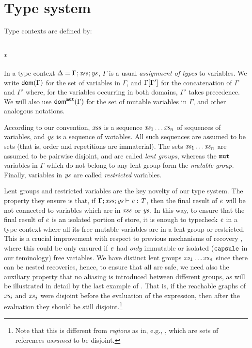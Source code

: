 \section{Type system}\label{sect:typesystem}
Type contexts are defined by:
\begin{center}
\begin{grammatica}
\\*
\end{grammatica}
\end{center} 
{In a type context $\Delta=\Gamma;\mathit{xss};\mathit{ys}$, $\Gamma$ is a usual {\em assignment of types} to variables. We write $\textsf{dom}(\Gamma)$ for the set of variables in $\Gamma$, and  $\Gamma[\Gamma']$ for the concatenation of $\Gamma$ and $\Gamma'$ where, for the variables occurring in both domains, $\Gamma'$ takes precedence.  We will also use $\textsf{dom}^{\texttt{mut}}(\Gamma)$ for the set of mutable variables in $\Gamma$, and other analogous notations.}

{According to our convention, $\mathit{xss}$ is a sequence $\mathit{xs}_1\ldots\mathit{xs}_n$ of sequences of variables, and $\mathit{ys}$ is a sequence of variables. All such sequences are assumed to be sets (that is, order and repetitions are immaterial). The sets  $\mathit{xs}_1\ldots\mathit{xs}_n$ are assumed to be pairwise disjoint, and are called \emph{{lent group}s}, whereas the $\texttt{mut}$ variables in $\Gamma$ which do not belong to any lent group form the \emph{{mutable group}}. Finally, variables in $\mathit{ys}$ are called \emph{restricted} variables.}

{Lent groups and restricted variables are the key novelty of our type system.
The property they ensure is that, if $\Gamma;\mathit{xss};\mathit{ys}\vdash \mathit{e}:\mathit{T}$, then the final result of $\mathit{e}$ will be not connected to variables which are in $\mathit{xss}$ or $\mathit{ys}$. In this way, to ensure that the final result of $\mathit{e}$ is an isolated portion of store, it is enough to typecheck $\mathit{e}$ in a type context where all its free mutable variables are in a {lent group} or restricted.  This is a crucial improvement with respect to previous mechanisms of recovery \cite{GordonEtAl12,ClebschEtAl15}, where this could be only ensured if  $\mathit{e}$ had \emph{only} immutable or isolated ($\texttt{capsule}$ in our teminology) free variables. 
We have distinct {lent group}s $\mathit{xs}_1\ldots\mathit{xs}_n$ since there can be nested recoveries, hence, to ensure that all are safe, we need also the auxiliary property that no aliasing is introduced between different groups, as will be illustrated in detail by the last example of . That is, if the reachable graphs of $\mathit{xs}_i$ and $\mathit{xs}_j$ were disjoint before the evaluation of the expression, then after the evaluation they should be still disjoint.\footnote{Note that this is different from \emph{regions} as in, e.g., \cite{BocchinoEtAl09,HallerOdersky10}, which are sets of references \emph{assumed} to be disjoint.}} 

